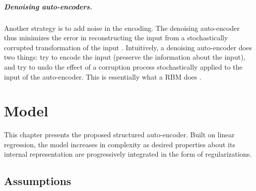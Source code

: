 \paragraph{Denoising auto-encoders.}
Another strategy is to add noise in the encoding. The denoising auto-encoder thus minimizes the error in reconstructing the input from a stochastically corrupted transformation of the input \cite{bengio2008denoisingAutoencoders}. Intuitively, a denoising auto-encoder does two things: try to encode the input (preserve the information about the input), and try to undo the effect of a corruption process stochastically applied to the input of the auto-encoder. This is essentially what a \gls{RBM} does \cite{hinton2002RBM}.




\chapter{Model} \label{chap:model}

This chapter presents the proposed structured auto-encoder. Built on linear regression, the model increases in complexity as desired properties about its internal representation are progressively integrated in the form of regularizations.


\section{Assumptions} \label{sec:assumptions}

